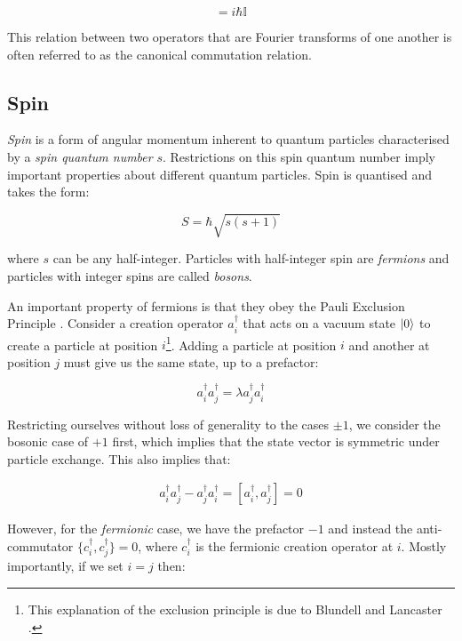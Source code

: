 \begin{equation}
	[\hat{x}, \hat{p}] = i \hbar \mathbb{I}
\end{equation}

This relation between two operators that are Fourier transforms of one another is often referred to as the canonical commutation relation.


\subsection{Spin}\label{subsec:spin}
\textit{Spin} is a form of angular momentum inherent to quantum particles characterised by a \textit{spin quantum number} $s$. Restrictions on this spin quantum number imply important properties about different quantum particles. Spin is quantised and takes the form:

\begin{equation}\label{eq:spin_number}
	S = \hbar \sqrt{s(s + 1)}
\end{equation}

where $s$ can be any half-integer. Particles with half-integer spin are \textit{fermions} and particles with integer spins are called \textit{bosons}.

An important property of fermions is that they obey the Pauli Exclusion Principle \cite{pauli_nobel}. Consider a creation operator $a_i^\dagger$ that acts on a vacuum state $\ket{0}$ to create a particle at position $i$\footnote{This explanation of the exclusion principle is due to Blundell and Lancaster \cite{blundell_qft}.}. Adding a particle at position $i$ and another at position $j$ must give us the same state, up to a prefactor:

\begin{equation}
	a_i^\dagger a_j^\dagger = \lambda a_j^\dagger a_i^\dagger
\end{equation}

Restricting ourselves without loss of generality to the cases $\pm1$, we consider the bosonic case of $+1$ first, which implies that the state vector is symmetric under particle exchange. This also implies that:

\begin{gather}
	a_i^\dagger a_j^\dagger - a_j^\dagger a_i^\dagger = [a_i^\dagger, a_j^\dagger] = 0
\end{gather}

However, for the \textit{fermionic} case, we have the prefactor $-1$ and instead the anti-commutator $\{c_i^\dagger, c_j^\dagger\} = 0$, where $c_i^\dagger$ is the fermionic creation operator at $i$. Mostly importantly, if we set $i = j$ then:

